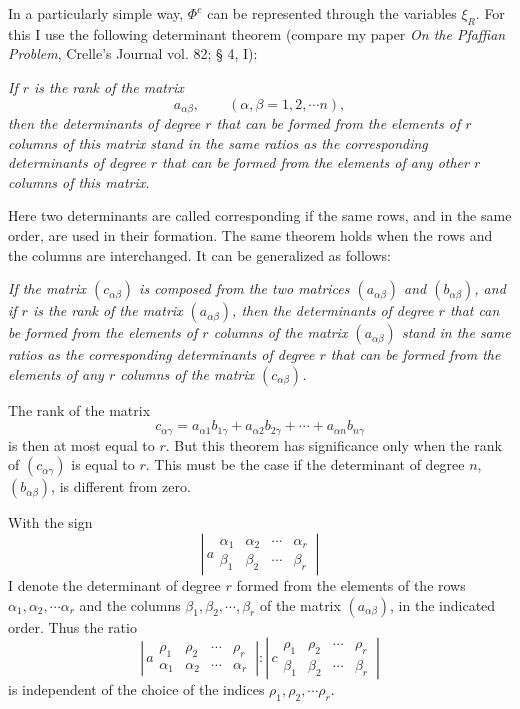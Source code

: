 \documentclass[11pt]{article}
\begin{document}
In a particularly simple way, $\Phi^e$ can be represented through the variables $\xi_R$. For this I use the following determinant theorem (compare my paper \emph{On the Pfaffian Problem}, Crelle's Journal vol. 82; § 4, I):

\emph{If $r$ is the rank of the matrix}
\[
a_{\alpha\beta},\qquad (\alpha,\beta=1,2,\cdots n),
\]
\emph{then the determinants of degree $r$ that can be formed from the elements of $r$ columns of this matrix stand in the same ratios as the corresponding determinants of degree $r$ that can be formed from the elements of any other $r$ columns of this matrix.}

Here two determinants are called corresponding if the same rows, and in the same order, are used in their formation. The same theorem holds when the rows and the columns are interchanged. It can be generalized as follows:

\emph{If the matrix $(c_{\alpha\beta})$ is composed from the two matrices $(a_{\alpha\beta})$ and $(b_{\alpha\beta})$, and if $r$ is the rank of the matrix $(a_{\alpha\beta})$, then the determinants of degree $r$ that can be formed from the elements of $r$ columns of the matrix $(a_{\alpha\beta})$ stand in the same ratios as the corresponding determinants of degree $r$ that can be formed from the elements of any $r$ columns of the matrix $(c_{\alpha\beta})$.}

The rank of the matrix
\[
c_{\alpha\gamma}=a_{\alpha1}b_{1\gamma}+a_{\alpha2}b_{2\gamma}+\cdots+a_{\alpha n}b_{n\gamma}
\]
is then at most equal to $r$. But this theorem has significance only when the rank of $(c_{\alpha\gamma})$ is equal to $r$. This must be the case if the determinant of degree $n$, $(b_{\alpha\beta})$, is different from zero.

With the sign
\[
\left|\,a\begin{array}{cccc}
\alpha_1&\alpha_2&\cdots&\alpha_r\\
\beta_1&\beta_2&\cdots&\beta_r
\end{array}\,\right|
\]
I denote the determinant of degree $r$ formed from the elements of the rows $\alpha_1,\alpha_2,\cdots\alpha_r$ and the columns $\beta_1,\beta_2,\cdots,\beta_r$ of the matrix $(a_{\alpha\beta})$, in the indicated order. Thus the ratio
\[
\left|\,a\begin{array}{cccc}
\rho_1&\rho_2&\cdots&\rho_r\\
\alpha_1&\alpha_2&\cdots&\alpha_r
\end{array}\,\right|:
\left|\,c\begin{array}{cccc}
\rho_1&\rho_2&\cdots&\rho_r\\
\beta_1&\beta_2&\cdots&\beta_r
\end{array}\,\right|
\]
is independent of the choice of the indices $\rho_1,\rho_2,\cdots\rho_r$.
\end{document}

